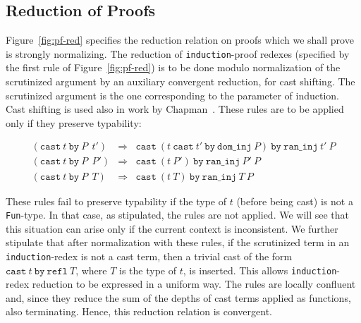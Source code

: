 \documentclass{fundam}
\begin{document}
\subsection{Reduction of Proofs}

Figure~\ref{fig:pf-red} specifies the reduction relation on proofs
which we shall prove is strongly normalizing.  The reduction of
\texttt{induction}-proof redexes (specified by the first rule of
Figure~\ref{fig:pf-red}) is to be done modulo normalization of the
scrutinized argument by an auxiliary convergent reduction, for cast
shifting.  The scrutinized argument is the one corresponding to the
parameter of induction.  Cast shifting is used also in work by
Chapman~\cite{chapman08}.  These rules are to be applied only if they
preserve typability:

\[
\begin{array}{lll}
(\texttt{cast}\ t\ \texttt{by}\ P\ \ t') & \Rightarrow & \texttt{cast}\ (t\ \texttt{cast}\ t'\ \texttt{by}\ \texttt{dom\_inj}\ P)\ \texttt{by}\ \texttt{ran\_inj}\ t'\ P \\ 
(\texttt{cast}\ t\ \texttt{by}\ P\ \ P') & \Rightarrow & \texttt{cast}\ (t\ P')\ \texttt{by}\ \texttt{ran\_inj}\ P'\ P \\
(\texttt{cast}\ t\ \texttt{by}\ P\ \ T) & \Rightarrow & \texttt{cast}\ (t\ T)\ \texttt{by}\ \texttt{ran\_inj}\ T\ P
\end{array}
\]

\noindent These rules fail to preserve typability if the type of $t$
(before being cast) is not a \texttt{Fun}-type.  In that case, as
stipulated, the rules are not applied.  We will see that this
situation can arise only if the current context is inconsistent.  We
further stipulate that after normalization with these rules, if the
scrutinized term in an \texttt{induction}-redex is not a cast term,
then a trivial cast of the form $\texttt{cast}\ t\ \texttt{by}\
\texttt{refl}\ T$, where $T$ is the type of $t$, is inserted.  This
allows \texttt{induction}-redex reduction to be expressed in a uniform
way.  The rules are locally confluent and, since they reduce the sum
of the depths of cast terms applied as functions, also terminating.
Hence, this reduction relation is convergent.

\end{document}
